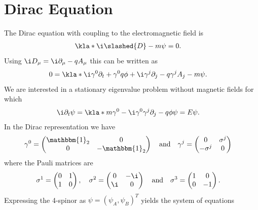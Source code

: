 \documentclass[english, parskip=full]{scrartcl}
\title{\titel}
\author{\autor}
\date{\today}
\begin{document}
\maketitle  %

\section{Dirac Equation}
The Dirac equation with coupling to the electromagnetic field is
\begin{align}
\kla*{\i\slashed{D} - m}\psi &= 0.
\end{align}
Using $\i D_\mu = \i \partial_\mu - qA_\mu$ this can be written as
\begin{align}
0 &= \kla*{\i\gamma^0\partial_t + \gamma^0 q\phi + \i\gamma^j\partial_j - q\gamma^j A_j - m}\psi.
\end{align}
We are interested in a stationary eigenvalue problem without magnetic fields for which
\begin{align}
\i\partial_t \psi &= \kla*{m\gamma^0 - \i\gamma^0\gamma^j \partial_j - q\phi}\psi = E\psi.
\end{align}
In the Dirac representation we have
\begin{align}
\gamma^0 &= \begin{pmatrix}
\mathbbm{1}_2 & 0 \\ 0 & -\mathbbm{1}_2
\end{pmatrix} \quad\text{and}\quad \gamma^j = \begin{pmatrix}
0 & \sigma^j \\ -\sigma^j & 0
\end{pmatrix}
\end{align}
where the Pauli matrices are
\begin{align}
\sigma^1 &= \begin{pmatrix}
0 & 1 \\ 1 & 0
\end{pmatrix}, \quad \sigma^2 = \begin{pmatrix}
0 & -\i \\ \i & 0
\end{pmatrix}\quad \text{and} \quad \sigma^3 = \begin{pmatrix}
1 & 0 \\ 0 & -1
\end{pmatrix}.
\end{align}
Expressing the 4-spinor as $\psi = (\psi_A, \psi_B)^T$ yields the system of equations
\end{document}
